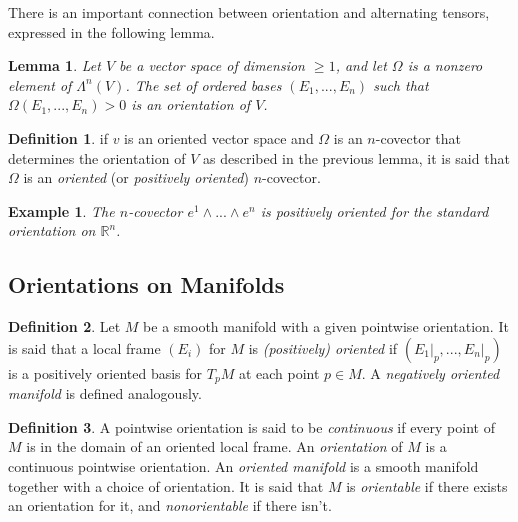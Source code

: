 \documentclass{article}
\newtheorem{lemma}[theorem]{Lemma}
\newtheorem{example}{Example}[section]
\theoremstyle{remark}
\theoremstyle{definition}
\newtheorem{definition}{Definition}[section]
\begin{document}
There is an important connection between orientation and alternating tensors, expressed in the following lemma. 

\begin{lemma}
Let $V$ be a vector space of dimension $\geq 1$, and let $\Omega$ is a nonzero element of $\Lambda^n (V)$. The set of ordered bases $(E_1, ..., E_n)$ such that $\Omega (E_1, ..., E_n) > 0$ is an orientation of $V$. 
\end{lemma}

\begin{definition}
if $v$ is an oriented vector space and $\Omega$ is an $n$-covector that determines the orientation of $V$ as described in the previous lemma, it is said that $\Omega$ is an \textit{oriented} (or \textit{positively oriented}) $n$-covector. 
\end{definition}

\begin{example}
The $n$-covector $e^1 \wedge ... \wedge e^n$ is positively oriented for the standard orientation on $\mathbb{R}^n$. 
\end{example}

\subsection{Orientations on Manifolds}

\begin{definition}
Let $M$ be a smooth manifold with a given pointwise orientation. It is said that a local frame $(E_i)$ for $M$ is \textit{(positively) oriented} if $(E_1 \big|_p, ..., E_n \big|_p)$ is a positively oriented basis for $T_p M$ at each point $p \in M$. A \textit{negatively oriented manifold} is defined analogously. 
\end{definition}

\begin{definition}
A pointwise orientation is said to be \textit{continuous} if every point of $M$ is in the domain of an oriented local frame. An \textit{orientation} of $M$ is a continuous pointwise orientation. An \textit{oriented manifold} is a smooth manifold together with a choice of orientation. It is said that $M$ is \textit{orientable} if there exists an orientation for it, and \textit{nonorientable} if there isn't. 
\end{definition}
\end{document}
